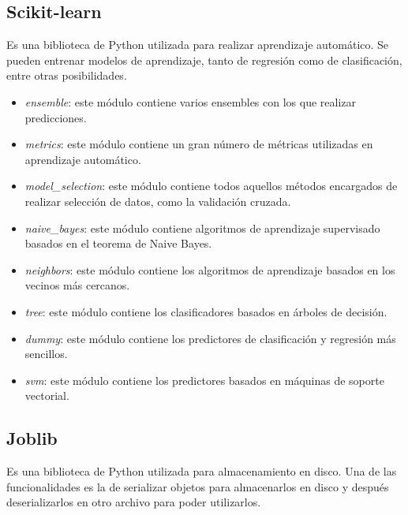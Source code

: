 \subsection{Scikit-learn}
Es una biblioteca de Python utilizada para realizar aprendizaje automático. Se pueden entrenar modelos de aprendizaje, tanto de regresión como de clasificación, entre otras posibilidades.
\begin{itemize}
	\item \textit{ensemble}: este módulo contiene varios ensembles con los que realizar predicciones. \cite{skensemble}
	\item \textit{metrics}: este módulo contiene un gran número de métricas utilizadas en aprendizaje automático. \cite{skmetrics}
	\item \textit{model\_selection}: este módulo contiene todos aquellos métodos encargados de realizar selección de datos, como la validación cruzada. \cite{skmodsel}
	\item \textit{naive\_bayes}: este módulo contiene algoritmos de aprendizaje supervisado basados en el teorema de Naive Bayes. \cite{sknbayes}
	\item \textit{neighbors}: este módulo contiene los algoritmos de aprendizaje basados en los vecinos más cercanos. \cite{skneighbors}
	\item \textit{tree}: este módulo contiene los clasificadores basados en árboles de decisión. \cite{sktree}
	\item \textit{dummy}: este módulo contiene los predictores de clasificación y regresión más sencillos.
	\item \textit{svm}: este módulo contiene los predictores basados en máquinas de soporte vectorial. \cite{sksvm}
\end{itemize}

\subsection{Joblib}
Es una biblioteca de Python utilizada para almacenamiento en disco. Una de las funcionalidades es la de serializar objetos para almacenarlos en disco y después deserializarlos en otro archivo para poder utilizarlos.

